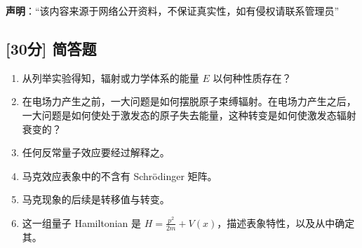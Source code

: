 
\textbf{声明}：“该内容来源于网络公开资料，不保证真实性，如有侵权请联系管理员”

\subsection{[30分] 简答题}
 \begin{enumerate}
        \item 从列举实验得知，辐射或力学体系的能量 $E$ 以何种性质存在？
        \item 在电场力产生之前，一大问题是如何摆脱原子束缚辐射。在电场力产生之后，一大问题是如何使处于激发态的原子失去能量，这种转变是如何使激发态辐射衰变的？
        \item 任何反常量子效应要经过解释之。
        \item 马克效应表象中的不含有 Schrödinger 矩阵。
        \item 马克现象的后续是转移值与转变。
        \item 这一组量子 Hamiltonian 是 $H = \frac{p^2}{2m} + V(x)$，描述表象特性，以及从中确定其。
    \end{enumerate}